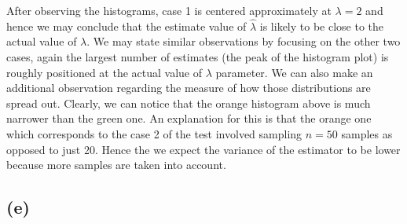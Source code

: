 \documentclass[12pt]{article}
\begin{document}
After observing the histograms, case 1 is centered approximately at $ \lambda = 2 $ and hence we may conclude that the estimate value of $ \hat{\lambda} $ is likely to be close to the actual value of $\lambda$. We may state similar observations by focusing on the other two cases, again the largest number of estimates (the peak of the histogram plot) is roughly positioned at the actual value of $\lambda$ parameter. We can also make an additional observation regarding the measure of how those distributions are spread out. Clearly, we can notice that the orange histogram above is much narrower than the green one. An explanation for this is that the orange one which corresponds to the case 2 of the test involved sampling $ n = 50 $ samples as opposed to just 20. Hence the we expect the variance of the estimator to be lower because more samples are taken into account.

\subsection*{(e)}
\end{document}
